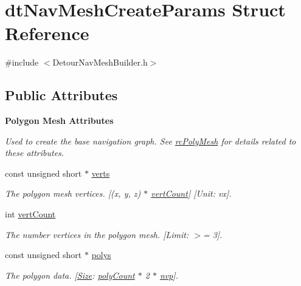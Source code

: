 \hypertarget{structdtNavMeshCreateParams}{}\section{dt\+Nav\+Mesh\+Create\+Params Struct Reference}
\label{structdtNavMeshCreateParams}


{\ttfamily \#include $<$Detour\+Nav\+Mesh\+Builder.\+h$>$}

\subsection*{Public Attributes}
\begin{Indent}\textbf{ Polygon Mesh Attributes}\par
{\em Used to create the base navigation graph. See \hyperlink{structrcPolyMesh}{rc\+Poly\+Mesh} for details related to these attributes. }\begin{DoxyCompactItemize}
\item 
\mbox{\label{structdtNavMeshCreateParams_a2f50fefd2ed07d72543f4f4d6db73c56}} 
const unsigned short $\ast$ \hyperlink{structdtNavMeshCreateParams_a2f50fefd2ed07d72543f4f4d6db73c56}{verts}
\begin{DoxyCompactList}\small\item\em The polygon mesh vertices. \mbox{[}(x, y, z) $\ast$ \hyperlink{structdtNavMeshCreateParams_a5cc3d74f4b38715cb1adf01c7d118c3f}{vert\+Count}\mbox{]} \mbox{[}Unit\+: vx\mbox{]}. \end{DoxyCompactList}\item 
\mbox{\label{structdtNavMeshCreateParams_a5cc3d74f4b38715cb1adf01c7d118c3f}} 
int \hyperlink{structdtNavMeshCreateParams_a5cc3d74f4b38715cb1adf01c7d118c3f}{vert\+Count}
\begin{DoxyCompactList}\small\item\em The number vertices in the polygon mesh. \mbox{[}Limit\+: $>$= 3\mbox{]}. \end{DoxyCompactList}\item 
\mbox{\label{structdtNavMeshCreateParams_adff63fe6c3a13b9498654eefc1fccb5e}} 
const unsigned short $\ast$ \hyperlink{structdtNavMeshCreateParams_adff63fe6c3a13b9498654eefc1fccb5e}{polys}
\begin{DoxyCompactList}\small\item\em The polygon data. \mbox{[}\hyperlink{classSize}{Size}\+: \hyperlink{structdtNavMeshCreateParams_ade05d506a6505335142d06f18a35cc45}{poly\+Count} $\ast$ 2 $\ast$ \hyperlink{structdtNavMeshCreateParams_aa0cacf292dd206fe7da335461c3af65c}{nvp}\mbox{]}. \end{DoxyCompactList}\item 

\end{DoxyCompactItemize}
\end{Indent}
